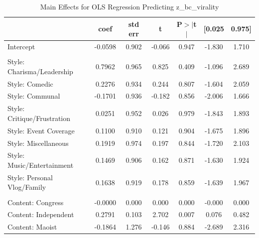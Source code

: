 \documentclass[12pt,a4paper]{report}
\begin{document}
\begin{table}
    \centering
    \captionsetup{justification=centering}
    \caption{Main Effects for OLS Regression Predicting z\_bc\_virality}
    \label{tab:ols_virality_main}
    \scriptsize
    \setlength{\tabcolsep}{3pt}

    \begin{tabular}{@{}l S[table-format=-1.4] S[table-format=1.3] S[table-format=-1.3] S[table-format=1.3] S[table-format=-1.3] S[table-format=1.3]@{}}
        \toprule
        & {\textbf{coef}} & {\textbf{std err}} & {\textbf{t}} & {\textbf{P$> |$t$|$}} & {\textbf{[0.025}} & {\textbf{0.975]}} \\
        \midrule
        Intercept                            & -0.0598 & 0.902 & -0.066 & 0.947 & -1.830 & 1.710 \\
        \addlinespace
         \\ \addlinespace
        Style: Charisma/Leadership           & 0.7962  & 0.965 & 0.825  & 0.409 & -1.096 & 2.689 \\
        Style: Comedic                       & 0.2276  & 0.934 & 0.244  & 0.807 & -1.604 & 2.059 \\
        Style: Communal                      & -0.1701 & 0.936 & -0.182 & 0.856 & -2.006 & 1.666 \\
        Style: Critique/Frustration          & 0.0251  & 0.952 & 0.026  & 0.979 & -1.843 & 1.893 \\
        Style: Event Coverage                & 0.1100  & 0.910 & 0.121  & 0.904 & -1.675 & 1.896 \\
        Style: Miscellaneous                 & 0.1919  & 0.974 & 0.197  & 0.844 & -1.720 & 2.103 \\
        Style: Music/Entertainment           & 0.1469  & 0.906 & 0.162  & 0.871 & -1.630 & 1.924 \\
        Style: Personal Vlog/Family          & 0.1638  & 0.919 & 0.178  & 0.859 & -1.639 & 1.967 \\
        \addlinespace
         \\ \addlinespace
        Content: Congress                    & -0.0000 & 0.000 & 0.000  & 0.000 & -0.000 & 0.000 \\
        Content: Independent                 & 0.2791  & 0.103 & 2.702  & 0.007 & 0.076  & 0.482 \\
        Content: Maoist                      & -0.1864 & 1.276 & -0.146 & 0.884 & -2.689 & 2.316 \\

\end{tabular}
\end{table}
\end{document}
